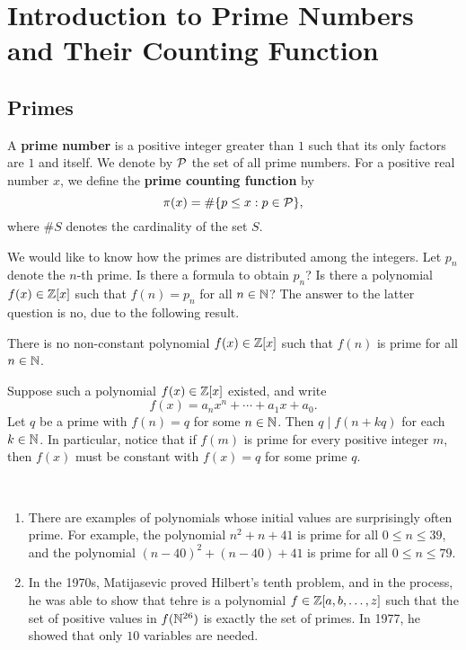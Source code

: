 \section{Introduction to Prime Numbers and Their Counting Function}

\subsection{Primes}

\begin{defn}
A {\bf prime number} is a positive integer greater than $1$ such that its only factors are $1$ and 
itself. We denote by ${\cal P}$ the set of all prime numbers. For a positive real number $x$, 
we define the {\bf prime counting function} by 
\[ \pi(x) = \#\{p \leq x : p \in {\cal P}\}, \]
where $\#S$ denotes the cardinality of the set $S$. 
\end{defn}

We would like to know how the primes are distributed among the integers. Let $p_n$ denote the 
$n$-th prime. Is there a formula to obtain $p_n$? Is there a polynomial $f(x) \in \mathbb{Z}[x]$ such that 
$f(n) = p_n$ for all $n \in \mathbb{N}$? The answer to the latter question is no, due to the following result. 

\begin{prop}
There is no non-constant polynomial $f(x) \in \mathbb{Z}[x]$ such that $f(n)$ is prime for all $n \in \mathbb{N}$. 
\end{prop}
\begin{pf}
Suppose such a polynomial $f(x) \in \mathbb{Z}[x]$ existed, and write 
\[ f(x) = a_n x^n + \cdots + a_1 x + a_0. \]
Let $q$ be a prime with $f(n) = q$ for some $n \in \mathbb{N}$. Then $q \mid f(n+kq)$ for each $k \in \mathbb{N}$. 
In particular, notice that if $f(m)$ is prime for every positive integer $m$, then $f(x)$ must be 
constant with $f(x) = q$ for some prime $q$. 
\end{pf}

\begin{remark}~
\begin{enumerate}[(1)]
    \item There are examples of polynomials whose initial values are surprisingly often prime. 
    For example, the polynomial $n^2 + n + 41$ is prime for all $0 \leq n \leq 39$, and the 
    polynomial $(n-40)^2 + (n-40) + 41$ is prime for all $0 \leq n \leq 79$. 
    \item In the 1970s, Matijasevic proved Hilbert's tenth problem, and in the process, he was able to
    show that tehre is a polynomial $f \in \mathbb{Z}[a, b, \dots, z]$ such that the set of positive 
    values in $f(\mathbb{N}^{26})$ is exactly the set of primes. In 1977, he showed that only $10$ variables 
    are needed.
\end{enumerate}
\end{remark}

